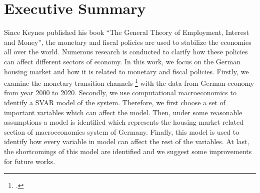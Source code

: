 \section*{Executive Summary}

Since Keynes published his book \enquote{The General Theory of Employment, Interest and Money}, the monetary and fiscal policies are used to stabilize the economies all over the world. Numerous research is conducted to clarify how these policies can affect different sectors of economy. In this work, we focus on the German housing market and  how it is related to monetary and fiscal policies. Firstly, we examine the monetary transition channels \footcite[See.][]{Mishkin1996} with the data from German economy from year 2000 to 2020. Secondly, we use computational macroeconomics to identify a \ac{SVAR} model of the system. Therefore, we first choose a set of important variables which can affect the model. Then, under some reasonable assumptions a model is identified which represents the housing market related section of macroeconomics system of Germany. Finally, this model is used to identify how every variable in model can affect the rest of the variables. At last, the shortcomings of this model are identified and we suggest some improvements for future works.